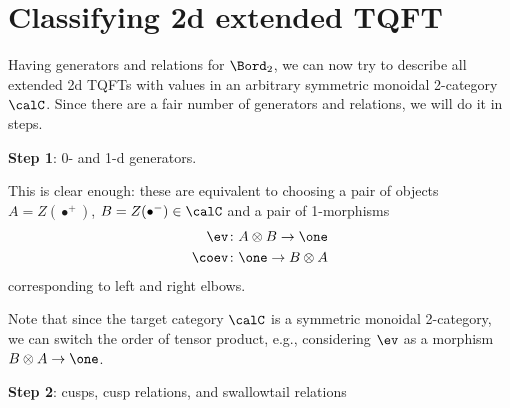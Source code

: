 \section{Classifying 2d extended TQFT}\label{s:2d-xtqft-classification}

Having generators and relations for $\Bord_2$, we can now try to describe
all extended 2d TQFTs with values in an arbitrary symmetric monoidal 2-category
$\calC$. Since there are a fair number of generators and relations, we will do
it in steps.



\textbf{Step 1}: 0- and 1-d generators.

This is clear enough: these are equivalent to choosing a pair of objects
$A=Z(\bullet^+)$, $B=Z(\bullet^-) \in \calC$ and a pair of 1-morphisms
$$
\begin{aligned}
  \ev & \colon A\otimes B\to \one\\
  \coev &\colon \one \to B\otimes A
\end{aligned}
$$
corresponding to left and right elbows.

Note that since the target category $\calC$ is a symmetric monoidal 2-category,
we can switch the order of tensor product, e.g., considering $\ev$ as a morphism
$B\otimes A\to \one$.

\textbf{Step 2}: cusps, cusp relations, and swallowtail relations

